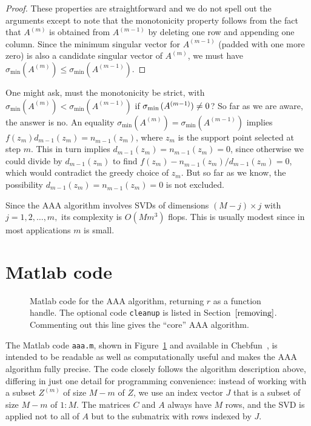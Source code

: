 \documentclass[final]{siamltex}
\def\Zm{Z^{(m)}}
\def\Am{A^{(m)}}
\begin{document}
\begin{proof}
These properties are straightforward and we do not spell out
the arguments except to note that the monotonicity property
follows from the fact that $\Am $ is obtained from $A^{(m-1)}$
by deleting one row and appending one column.  Since the minimum
singular vector for $A^{(m-1)}$ (padded with one more zero)
is also a candidate singular vector of $\Am $, we must have
$\sigma_{\min{}}(\Am ) \le\sigma_{\min{}}(A^{(m-1)})$.
\end{proof}

One might ask, must the monotonicity be strict, with
$\sigma_{\min{}}(\Am ) <\sigma_{\min{}}(A^{(m-1)})$
if $\sigma_{\min{}}(A^{(m-1)})\ne 0\kern .7pt$?
So far as we are aware, the answer is no.  An equality
$\sigma_{\min{}}(\Am ) = \sigma_{\min{}}(A^{(m-1)})$ implies
$f(z_m^{})d_{m-1}^{}(z_m^{}) =n_{m-1}^{}(z_m^{})$, where
$z_m^{}$ is the support point selected at step $m$.  This in
turn implies $d_{m-1}^{}(z_m^{}) =n_{m-1}^{}(z_m^{}) = 0$,
since otherwise we could divide by $d_{m-1}^{}(z_m^{})$ to find
$f(z_m^{})-n_{m-1}^{}(z_m^{})/d_{m-1}^{}(z_m^{}) = 0$, which
would contradict the greedy choice of $z_m^{}$.  But so far as
we know, the possibility $d_{m-1}^{}(z_m^{}) =n_{m-1}^{}(z_m^{})
= 0$ is not excluded.

Since the AAA algorithm involves SVDs of dimensions $(M-j)\times
j$ with $j = 1,2,\dots ,m,$ its complexity is $O(Mm^3)$ flops.
This is usually modest since in most applications $m$ is small.

\section{Matlab code}

\begin{figure}
{\footnotesize

\par}
\medskip
\caption{\label{codefig} Matlab code for the AAA algorithm,
returning\/ $r$ as a function handle.  The optional code {\tt cleanup} is
listed in Section~$\ref{removing}$.  Commenting out this line gives
the ``core'' AAA algorithm.}
\end{figure}

The Matlab code {\tt aaa.m}, shown in Figure~\ref{codefig} and
available in Chebfun~\cite{chebfun}, is intended to be readable
as well as computationally useful and makes the AAA algorithm
fully precise.  The code closely follows the algorithm description
above, differing in just one detail for programming convenience:
instead of working with a subset $\Zm$ of size $M-m$ of $Z$, we
use an index vector $J$ that is a subset of size $M-m$ of $1{:}M$.
The matrices $C$ and $A$ always have $M$ rows, and the SVD is
applied not to all of $A$ but to the submatrix with rows indexed
by $J$.
\end{document}
